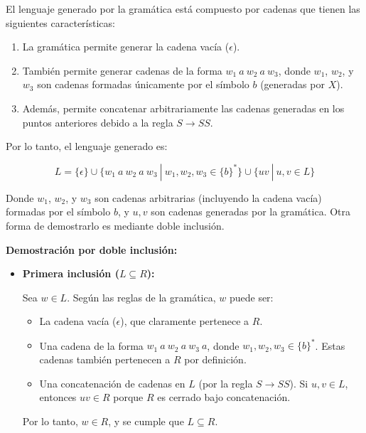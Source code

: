 \documentclass[12pt]{report} %
\begin{document}
\begin{enumerate}
  \begin{solucion}[Ejercicio 1.d]

   El lenguaje generado por la gramática está compuesto por cadenas que tienen las siguientes características:

   \begin{enumerate}
       \item La gramática permite generar la cadena vacía ($\epsilon$).
       \item También permite generar cadenas de la forma $w_1 \ a \ w_2 \ a \ w_3 $, donde $w_1$, $w_2$, y $w_3$ son cadenas formadas únicamente por el símbolo $b$ (generadas por $X$).
       \item Además, permite concatenar arbitrariamente las cadenas generadas en los puntos anteriores debido a la regla $S \to SS$.
   \end{enumerate}

   Por lo tanto, el lenguaje generado es:

   $$
   L = \{ \epsilon \} \cup \{ w_1 \ a \ w_2 \ a \ w_3  \ | \ w_1, w_2, w_3 \in \{b\}^* \} \cup \{ uv \ | \ u, v \in L \}
   $$

   Donde $w_1$, $w_2$, y $w_3$ son cadenas arbitrarias (incluyendo la cadena vacía) formadas por el símbolo $b$, y $u, v$ son cadenas generadas por la gramática. Otra forma de demostrarlo es mediante doble inclusión.

   \textbf{Demostración por doble inclusión:}

   \begin{itemize}
       \item \textbf{Primera inclusión ($L \subseteq R$):}

           Sea $w \in L$. Según las reglas de la gramática, $w$ puede ser:
           \begin{itemize}
               \item La cadena vacía ($\epsilon$), que claramente pertenece a $R$.
               \item Una cadena de la forma $w_1 \ a \ w_2 \ a \ w_3 \ a$, donde $w_1, w_2, w_3 \in \{b\}^*$. Estas cadenas también pertenecen a $R$ por definición.
               \item Una concatenación de cadenas en $L$ (por la regla $S \to SS$). Si $u, v \in L$, entonces $uv \in R$ porque $R$ es cerrado bajo concatenación.
           \end{itemize}

           Por lo tanto, $w \in R$, y se cumple que $L \subseteq R$.


\end{itemize}
\end{solucion}
\end{enumerate}
\end{document}
